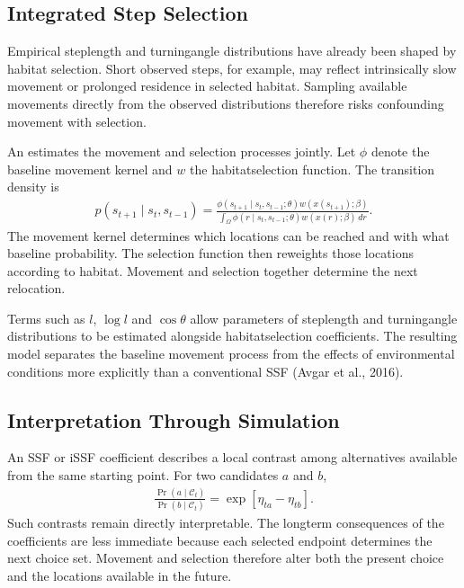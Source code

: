 \documentclass[letterpaper,10pt,english]{sphinxmanual}
\begin{document}
\subsection{Integrated Step Selection}
\label{\detokenize{theory:integrated-step-selection}}
\sphinxAtStartPar
Empirical step\sphinxhyphen{}length and turning\sphinxhyphen{}angle distributions have already been shaped by habitat selection. Short observed steps, for example, may reflect intrinsically slow movement or prolonged residence in selected habitat. Sampling available movements directly from the observed distributions therefore risks confounding movement with selection.

\sphinxAtStartPar
An  estimates the movement and selection processes jointly. Let \(\phi\) denote the baseline movement kernel and \(w\) the habitat\sphinxhyphen{}selection function. The transition density is
\begin{equation*}
\begin{split}
p
\left(
s_{t+1}
\mid
s_t,s_{t-1}
\right)
=
\frac{
\phi
\left(
s_{t+1}
\mid
s_t,s_{t-1};\theta
\right)
w
\left(
x(s_{t+1});\beta
\right)
}{
\displaystyle
\int_{\Omega}
\phi
\left(
r
\mid
s_t,s_{t-1};\theta
\right)
w
\left(
x(r);\beta
\right)\,dr
}.
\end{split}
\end{equation*}
\sphinxAtStartPar
The movement kernel determines which locations can be reached and with what baseline probability. The selection function then reweights those locations according to habitat. Movement and selection together determine the next relocation.

\sphinxAtStartPar
Terms such as \(l\), \(\log l\) and \(\cos\theta\) allow parameters of step\sphinxhyphen{}length and turning\sphinxhyphen{}angle distributions to be estimated alongside habitat\sphinxhyphen{}selection coefficients. The resulting model separates the baseline movement process from the effects of environmental conditions more explicitly than a conventional SSF (Avgar et al., 2016).


\subsection{Interpretation Through Simulation}
\label{\detokenize{theory:interpretation-through-simulation}}
\sphinxAtStartPar
An SSF or iSSF coefficient describes a local contrast among alternatives available from the same starting point. For two candidates \(a\) and \(b\),
\begin{equation*}
\begin{split}
\frac{
\Pr(a\mid\mathcal{C}_t)
}{
\Pr(b\mid\mathcal{C}_t)
}
=
\exp
\left[
\eta_{ta}-\eta_{tb}
\right].
\end{split}
\end{equation*}
\sphinxAtStartPar
Such contrasts remain directly interpretable. The long\sphinxhyphen{}term consequences of the coefficients are less immediate because each selected endpoint determines the next choice set. Movement and selection therefore alter both the present choice and the locations available in the future.
\end{document}
